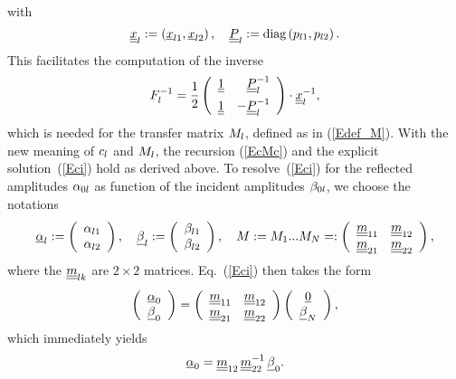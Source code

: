 with
\begin{equation}
  \underline{\underline{x}}_l :=
  \left(\underline{x}_{l1}, \underline{x}_{l2}\right),
  \quad
  \underline{\underline{P}}_l :=
  \text{diag}\left(p_{l1},p_{l2}\right).
\end{equation}
This facilitates the computation of the inverse
\begin{equation}
  F_l^{-1}
    = \frac{1}{2}
    \left(\begin{array}{cc}\underline{\underline{1}}&\hphantom{-}\underline{\underline{P}}_l^{-1}\\[1.2ex]
      \underline{\underline{1}} &-\underline{\underline{P}}_l^{-1}\end{array}\right)
      \cdot\underline{\underline{x}}_l^{-1},
\end{equation}
which is needed for the transfer matrix $M_l$,
defined as in (\ref{Edef_M}).
With the new meaning of $c_l$ and $M_l$,
the recursion (\ref{EcMc}) and the explicit solution~(\ref{Eci})
hold as derived above.
To resolve~(\ref{Eci}) for the reflected amplitudes $\alpha_{0l}$
as function of the incident amplitudes $\beta_{0l}$,
we choose the notations
\begin{equation}
  \u\alpha_\il
  :=\left(\begin{array}{c}\alpha_{\il1}\\\alpha_{\il2}\end{array}\right),\quad
  \u\beta_\il
  :=\left(\begin{array}{c}\beta_{\il1}\\\beta_{\il2}\end{array}\right),\quad
  M:=M_1 ... M_N %
  =:\left(\begin{array}{cc}\uu m_{11}&\uu m_{12}\\
                           \uu m_{21}&\uu m_{22}\end{array}\right),
\end{equation}
where the $\underline{\underline{m}}_{l k}$ are $2\times2$ matrices.
Eq.~(\ref{Eci}) then takes the form
\begin{equation}
  \left(\begin{array}{c}\underline{\alpha}_{0}\\\underline{\beta}_{0}\end{array}\right)
  = 
  \left(\begin{array}{cc}\underline{\underline{m}}_{11}&\underline{\underline{m}}_{12}\\
    \underline{\underline{m}}_{21}&\underline{\underline{m}}_{22}\end{array}\right)
  \left(\begin{array}{c}\underline{0}\\\underline{\beta}_{N}\end{array}\right),
\end{equation}
which immediately yields
\begin{equation}
  \underline{\alpha}_0 = \underline{\underline{m}}_{12}\,\underline{\underline{m}}_{22}^{-1}\,\underline{\beta}_0.
\end{equation}

\fi

%

